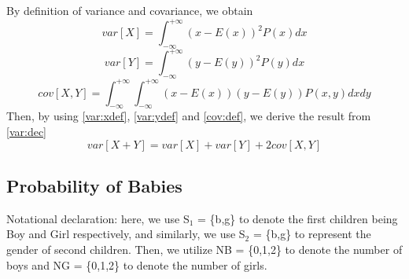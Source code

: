 \documentclass[11pt,a4paper]{article}
\newcommand{\htab}{\hspace*{0.63cm}}
\newcommand{\infint}{\int_{-\infty}^{+\infty}}
\newcommand{\dinfint}{\int_{-\infty}^{+\infty}\int_{-\infty}^{+\infty}}
\begin{document}
\htab By definition of variance and covariance, we obtain
    \begin{equation} \label{var:xdef} var[X]= \infint (x-E(x))^{2} P(x) dx  \end{equation}
    \begin{equation} \label{var:ydef} var[Y]= \infint (y-E(y))^{2} P(y) dx  \end{equation}
    \begin{equation} \label{cov:def} cov[X,Y]= \dinfint (x-E(x))(y-E(y)) P(x,y) dx dy  \end{equation}
\htab Then, by using \eqref{var:xdef}, \eqref{var:ydef} and \eqref{cov:def},
    we derive the result from \eqref{var:dec}
    \begin{equation}
        var[X+Y] = var[X] + var[Y] + 2cov[X,Y]
    \end{equation} 

\newpage

\subsection{Probability of Babies}
\htab Notational declaration: here, we use S$_{1}$ = \{b,g\} to denote the first children being Boy and Girl respectively, and similarly, we use S$_{2}$ = \{b,g\} to represent the gender of second children. Then, we utilize NB = \{0,1,2\} to denote the number of boys and NG = \{0,1,2\} to denote the number of girls.
\end{document}
